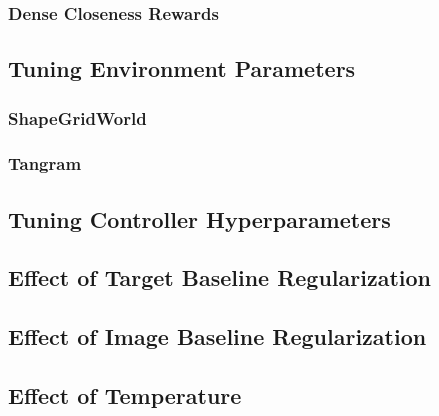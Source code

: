 \subsubsection{Dense Closeness Rewards}
\label{sec:dense-closeness}


\subsection{Tuning Environment Parameters}
\label{sec:env-hyperparameters}

\subsubsection{ShapeGridWorld}
\label{sec:sgw-parameters}


\subsubsection{Tangram}
\label{sec:tangram-parameters}


\subsection{Tuning Controller Hyperparameters}
\label{sec:icem-hyperparameters}


\subsection{Effect of Target Baseline Regularization}
\label{sec:reg-alpha}


\subsection{Effect of Image Baseline Regularization}
\label{sec:reg-beta}


\subsection{Effect of Temperature}
\label{sec:reg-temperature}



